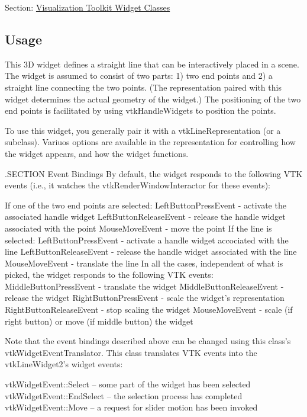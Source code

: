Section\-: \hyperlink{sec_vtkwidgets}{Visualization Toolkit Widget Classes} \hypertarget{vtkwidgets_vtkxyplotwidget_Usage}{}\subsection{Usage}\label{vtkwidgets_vtkxyplotwidget_Usage}
This 3\-D widget defines a straight line that can be interactively placed in a scene. The widget is assumed to consist of two parts\-: 1) two end points and 2) a straight line connecting the two points. (The representation paired with this widget determines the actual geometry of the widget.) The positioning of the two end points is facilitated by using vtk\-Handle\-Widgets to position the points.

To use this widget, you generally pair it with a vtk\-Line\-Representation (or a subclass). Variuos options are available in the representation for controlling how the widget appears, and how the widget functions.

.S\-E\-C\-T\-I\-O\-N Event Bindings By default, the widget responds to the following V\-T\-K events (i.\-e., it watches the vtk\-Render\-Window\-Interactor for these events)\-: 
\begin{DoxyPre}
 If one of the two end points are selected:
   LeftButtonPressEvent - activate the associated handle widget
   LeftButtonReleaseEvent - release the handle widget associated with the point
   MouseMoveEvent - move the point
 If the line is selected:
   LeftButtonPressEvent - activate a handle widget accociated with the line 
   LeftButtonReleaseEvent - release the handle widget associated with the line
   MouseMoveEvent - translate the line
 In all the cases, independent of what is picked, the widget responds to the 
 following VTK events:
   MiddleButtonPressEvent - translate the widget
   MiddleButtonReleaseEvent - release the widget
   RightButtonPressEvent - scale the widget's representation
   RightButtonReleaseEvent - stop scaling the widget
   MouseMoveEvent - scale (if right button) or move (if middle button) the widget
 \end{DoxyPre}


Note that the event bindings described above can be changed using this class's vtk\-Widget\-Event\-Translator. This class translates V\-T\-K events into the vtk\-Line\-Widget2's widget events\-: 
\begin{DoxyPre}
   vtkWidgetEvent::Select -- some part of the widget has been selected
   vtkWidgetEvent::EndSelect -- the selection process has completed
   vtkWidgetEvent::Move -- a request for slider motion has been invoked
 \end{DoxyPre}


